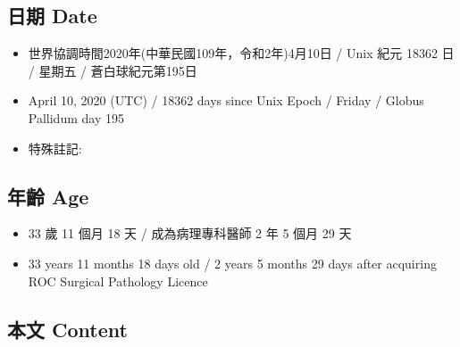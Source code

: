 \documentclass[
]{article}
\providecommand{\tightlist}{%
  \setlength{\itemsep}{0pt}\setlength{\parskip}{0pt}}
\begin{document}
\hypertarget{ux65e5ux671f-date-9}{%
\subsection{日期 Date}\label{ux65e5ux671f-date-9}}

\begin{itemize}
\tightlist
\item
  世界協調時間2020年(中華民國109年，令和2年)4月10日 / Unix 紀元 18362 日
  / 星期五 / 蒼白球紀元第195日
\item
  April 10, 2020 (UTC) / 18362 days since Unix Epoch / Friday / Globus
  Pallidum day 195
\item
  特殊註記:
\end{itemize}

\hypertarget{ux5e74ux9f61-age-9}{%
\subsection{年齡 Age}\label{ux5e74ux9f61-age-9}}

\begin{itemize}
\tightlist
\item
  33 歲 11 個月 18 天 / 成為病理專科醫師 2 年 5 個月 29 天
\item
  33 years 11 months 18 days old / 2 years 5 months 29 days after
  acquiring ROC Surgical Pathology Licence
\end{itemize}

\hypertarget{ux672cux6587-content-9}{%
\subsection{本文 Content}\label{ux672cux6587-content-9}}
\end{document}
